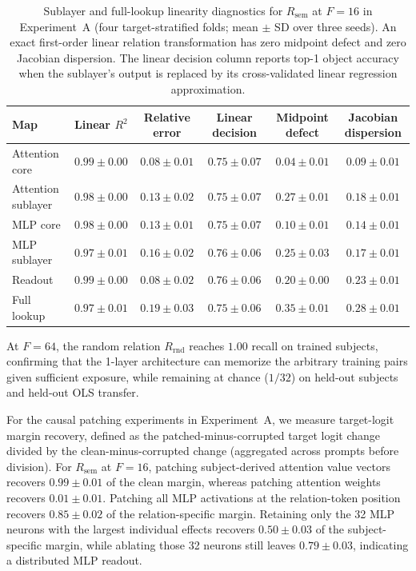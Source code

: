 \documentclass[11pt]{article}
\newcommand{\Rsem}{R_{\mathrm{sem}}}
\newcommand{\Rrnd}{R_{\mathrm{rnd}}}
\begin{document}
\begin{table}[t]
\centering
\scriptsize
\setlength{\tabcolsep}{3.6pt}
\begin{tabular}{lccccc}
\toprule
Map & Linear $R^2$ & Relative error & Linear decision & Midpoint defect & Jacobian dispersion \\
\midrule
Attention core & $0.99\pm0.00$ & $0.08\pm0.01$ & $0.75\pm0.07$ & $0.04\pm0.01$ & $0.09\pm0.01$ \\
Attention sublayer & $0.98\pm0.00$ & $0.13\pm0.02$ & $0.75\pm0.07$ & $0.27\pm0.01$ & $0.18\pm0.01$ \\
MLP core & $0.98\pm0.00$ & $0.13\pm0.01$ & $0.75\pm0.07$ & $0.10\pm0.01$ & $0.14\pm0.01$ \\
MLP sublayer & $0.97\pm0.01$ & $0.16\pm0.02$ & $0.76\pm0.06$ & $0.25\pm0.03$ & $0.17\pm0.01$ \\
Readout & $0.99\pm0.00$ & $0.08\pm0.02$ & $0.76\pm0.06$ & $0.20\pm0.00$ & $0.23\pm0.01$ \\
Full lookup & $0.97\pm0.01$ & $0.19\pm0.03$ & $0.75\pm0.06$ & $0.35\pm0.01$ & $0.28\pm0.01$ \\
\bottomrule
\end{tabular}
\caption{Sublayer and full-lookup linearity diagnostics for $\Rsem$ at $F=16$ in
Experiment~A (four target-stratified folds; mean $\pm$ SD over three seeds). An
exact first-order linear relation transformation has zero midpoint defect and zero Jacobian
dispersion. The linear decision column reports top-1 object accuracy when the
sublayer's output is replaced by its cross-validated linear regression approximation.}
\label{tab:goal1-transformations}
\end{table}

At $F=64$, the random relation $\Rrnd$ reaches $1.00$ recall on trained
subjects, confirming that the 1-layer architecture can memorize the arbitrary
training pairs given sufficient exposure, while remaining at chance ($1/32$) on
held-out subjects and held-out OLS transfer.

For the causal patching experiments in Experiment~A, we measure target-logit
margin recovery, defined as the patched-minus-corrupted target logit change
divided by the clean-minus-corrupted change (aggregated across prompts before
division). For $\Rsem$ at $F=16$, patching subject-derived attention value
vectors recovers $0.99\pm0.01$ of the clean margin, whereas patching
attention weights recovers $0.01\pm0.01$. Patching all MLP activations
at the relation-token position recovers $0.85\pm0.02$ of the
relation-specific margin. Retaining only the 32 MLP neurons with the largest
individual effects recovers $0.50\pm0.03$ of the subject-specific margin,
while ablating those 32 neurons still leaves $0.79\pm0.03$, indicating a
distributed MLP readout.
\end{document}
